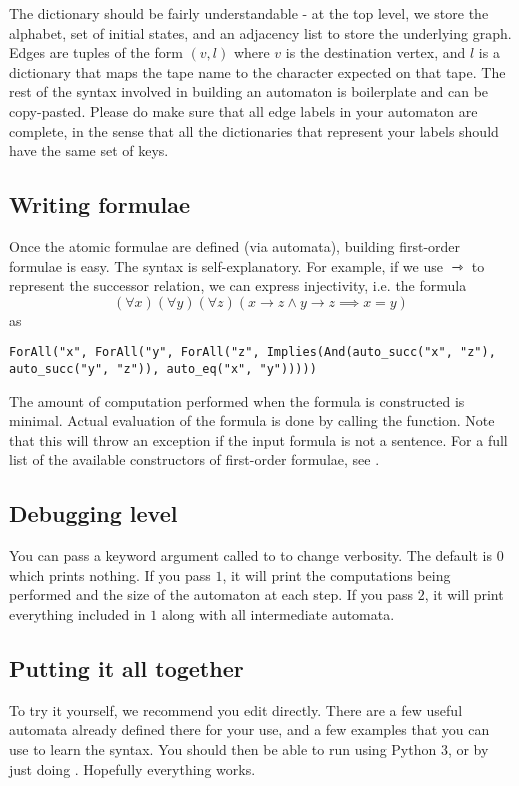 \documentclass{hw}
\begin{document}
The dictionary should be fairly understandable - at the top level, we store
the alphabet, set of initial states, and an adjacency list to store the
underlying graph. Edges are tuples of the form $(v, l)$ where $v$ is the
destination vertex, and $l$ is a dictionary that maps the tape name to the
character expected on that tape. The rest of the syntax involved
in building an automaton is boilerplate and can be copy-pasted.
Please do make sure that all edge labels in your automaton are complete,
in the sense that all the dictionaries that represent your labels should
have the same set of keys.

\subsection*{Writing formulae}
Once the atomic formulae are defined (via automata), building first-order formulae
is easy. The syntax is self-explanatory. For example, if we use $\rightarrowtriangle$
to represent the successor relation, we can express injectivity, i.e. the formula
$$(\forall x)(\forall y)(\forall z)(x \rightarrow z \wedge y \rightarrow z \implies x = y)$$
as
\begin{lstlisting}
ForAll("x", ForAll("y", ForAll("z", Implies(And(auto_succ("x", "z"),
auto_succ("y", "z")), auto_eq("x", "y")))))
\end{lstlisting}
The amount of computation performed when the formula is constructed is minimal.
Actual evaluation of the formula is done by calling the  function. Note that
this will throw an exception if the input formula is not a sentence.
For a full list of the available constructors of first-order formulae, see .

\subsection*{Debugging level}
You can pass a keyword argument called  to  to change
verbosity. The default is $0$ which prints nothing. If you pass $1$, it will print
the computations being performed and the size of the automaton at each step. If
you pass $2$, it will print everything included in $1$ along with all intermediate automata.

\subsection*{Putting it all together}
To try it yourself, we recommend you edit  directly. There are a few useful
automata already defined there for your use, and a few examples that you can use to learn
the syntax. You should then be able to run  using Python 3, or by just doing
.
Hopefully everything works.
\end{document}
